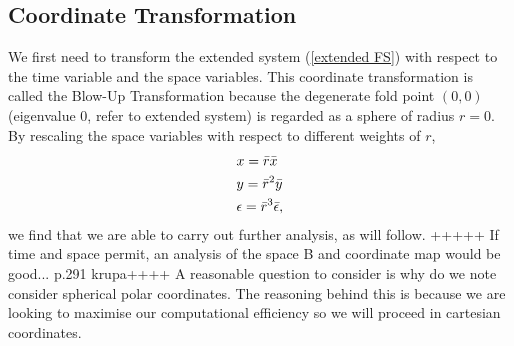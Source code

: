 \subsection{Coordinate Transformation}
We first need to transform the extended system (\ref{extended FS}) with respect to the time variable and the space variables. This coordinate transformation is called the Blow-Up Transformation because the degenerate fold point $(0,0)$ (eigenvalue 0, refer to extended system) is regarded as a sphere of radius $r=0$. By rescaling the space variables with respect to different weights of $r$,
\begin{subequations}
    \begin{align}
        &x=\Bar{r}\Bar{x}  \label{sys: blow up trans x}\\
        &y=\Bar{r}^2\Bar{y} \label{sys: blow up trans y}\\ 
        &\epsilon=\bar{r}^3\bar{\epsilon} \label{sys: blow up trans z},
    \end{align}  
    \label{sys: blow up trans}
\end{subequations}
we find that we are able to carry out further analysis, as will follow.
+++++ If time and space permit, an analysis of the space B and coordinate map would be good... p.291 krupa++++
A reasonable question to consider is why do we note consider spherical polar coordinates. The reasoning behind this is because we are looking to maximise our computational efficiency so we will proceed in cartesian coordinates. 

